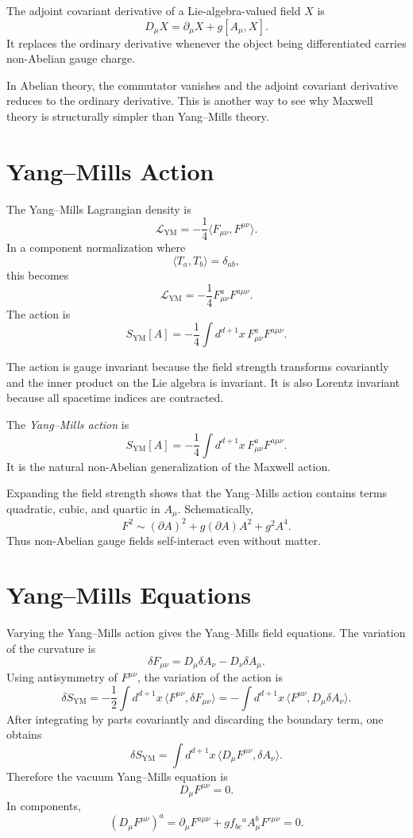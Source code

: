 \begin{definitionbox}
The adjoint covariant derivative of a Lie-algebra-valued field \(X\) is
\[
    D_\mu X=\partial_\mu X+g[A_\mu,X].
\]
It replaces the ordinary derivative whenever the object being differentiated
carries non-Abelian gauge charge.
\end{definitionbox}

In Abelian theory, the commutator vanishes and the adjoint covariant derivative
reduces to the ordinary derivative. This is another way to see why Maxwell
theory is structurally simpler than Yang--Mills theory.

\section{Yang--Mills Action}

The Yang--Mills Lagrangian density is
\[
    \mathcal{L}_{\mathrm{YM}}
    =-\frac{1}{4}\langle F_{\mu\nu},F^{\mu\nu}\rangle.
\]
In a component normalization where
\[
    \langle T_a,T_b\rangle=\delta_{ab},
\]
this becomes
\[
    \mathcal{L}_{\mathrm{YM}}
    =-\frac{1}{4}F_{\mu\nu}^aF^{a\mu\nu}.
\]
The action is
\[
    S_{\mathrm{YM}}[A]
    =-\frac{1}{4}\int d^{d+1}x\,F_{\mu\nu}^aF^{a\mu\nu}.
\]

The action is gauge invariant because the field strength transforms
covariantly and the inner product on the Lie algebra is invariant. It is also
Lorentz invariant because all spacetime indices are contracted.

\begin{definitionbox}
The \emph{Yang--Mills action} is
\[
    S_{\mathrm{YM}}[A]
    =-\frac{1}{4}\int d^{d+1}x\,F_{\mu\nu}^aF^{a\mu\nu}.
\]
It is the natural non-Abelian generalization of the Maxwell action.
\end{definitionbox}

Expanding the field strength shows that the Yang--Mills action contains terms
quadratic, cubic, and quartic in \(A_\mu\). Schematically,
\[
    F^2\sim (\partial A)^2+g(\partial A)A^2+g^2A^4.
\]
Thus non-Abelian gauge fields self-interact even without matter.

\section{Yang--Mills Equations}

Varying the Yang--Mills action gives the Yang--Mills field equations. The
variation of the curvature is
\[
    \delta F_{\mu\nu}=D_\mu\delta A_\nu-D_\nu\delta A_\mu.
\]
Using antisymmetry of \(F^{\mu\nu}\), the variation of the action is
\[
    \delta S_{\mathrm{YM}}
    =-\frac{1}{2}\int d^{d+1}x\,\langle F^{\mu\nu},\delta F_{\mu\nu}\rangle
    =-\int d^{d+1}x\,\langle F^{\mu\nu},D_\mu\delta A_\nu\rangle.
\]
After integrating by parts covariantly and discarding the boundary term, one
obtains
\[
    \delta S_{\mathrm{YM}}
    =\int d^{d+1}x\,\langle D_\mu F^{\mu\nu},\delta A_\nu\rangle.
\]
Therefore the vacuum Yang--Mills equation is
\[
    D_\mu F^{\mu\nu}=0.
\]
In components,
\[
    (D_\mu F^{\mu\nu})^a
    =\partial_\mu F^{a\mu\nu}
     +g f_{bc}{}^a A_\mu^b F^{c\mu\nu}=0.
\]

